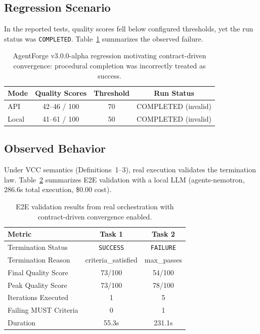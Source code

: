 \documentclass[11pt]{article}
\begin{document}
\subsection{Regression Scenario}
In the reported tests, quality scores fell below configured thresholds, yet the run status was \texttt{COMPLETED}. Table~\ref{tab:agentforge_regression} summarizes the observed failure.

\begin{table}[t]
\centering
\begin{tabular}{lccc}
\toprule
Mode & Quality Scores & Threshold & Run Status \\
\midrule
API   & 42--46 / 100 & 70 & COMPLETED (invalid) \\
Local & 41--61 / 100 & 50 & COMPLETED (invalid) \\
\bottomrule
\end{tabular}
\caption{AgentForge v3.0.0-alpha regression motivating contract-driven convergence: procedural completion was incorrectly treated as success.}
\label{tab:agentforge_regression}
\end{table}

\subsection{Observed Behavior}
Under VCC semantics (Definitions~1--3), real execution validates the termination law. Table~\ref{tab:e2e_results} summarizes E2E validation with a local LLM (agents-nemotron, 286.6s total execution, \$0.00 cost).

\begin{table}[t]
\centering
\caption{E2E validation results from real orchestration with contract-driven convergence enabled.}
\label{tab:e2e_results}
\begin{tabular}{lcc}
\toprule
Metric & Task 1 & Task 2 \\
\midrule
Termination Status & \texttt{SUCCESS} & \texttt{FAILURE} \\
Termination Reason & criteria\_satisfied & max\_passes \\
Final Quality Score & 73/100 & 54/100 \\
Peak Quality Score & 73/100 & 78/100 \\
Iterations Executed & 1 & 5 \\
Failing MUST Criteria & 0 & 1 \\
Duration & 55.3s & 231.1s \\
\bottomrule
\end{tabular}
\end{table}
\end{document}
